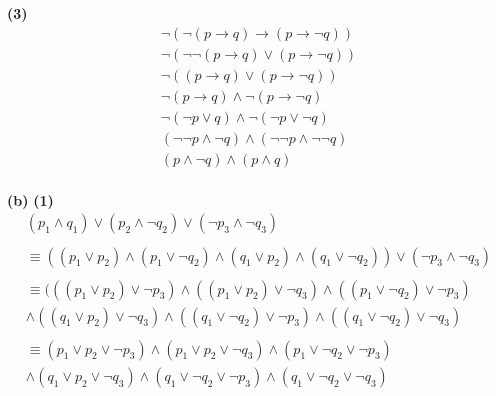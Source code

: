 \documentclass[11pt]{article}
\renewcommand{\part}[1] {\vspace{.10in} {\bf (#1)}}
\begin{document}
\part{3}
\begin{eqnarray*}
\neg (\neg(p \rightarrow q) \rightarrow (p \rightarrow \neg q))\\
\neg (\neg \neg(p \rightarrow q) \vee (p \rightarrow \neg q))\\
\neg ((p \rightarrow q) \vee (p \rightarrow \neg q))\\
\neg (p \rightarrow q) \wedge \neg (p \rightarrow \neg q)\\
\neg (\neg p \vee q) \wedge \neg (\neg p \vee \neg q)\\
(\neg \neg p \wedge \neg q) \wedge (\neg \neg p \wedge \neg \neg q)\\
(p \wedge \neg q) \wedge (p \wedge q)\\
\end{eqnarray*}

\part{b}
\part{1}
\begin{eqnarray*}
(p_1 \wedge q_1) \vee (p_2 \wedge \neg q_2) \vee (\neg p_3 \wedge \neg q_3)\\
\\
\equiv ((p_1 \vee p_2) \wedge (p_1 \vee \neg q_2) \wedge (q_1 \vee p_2) \wedge (q_1 \vee \neg q_2)) \vee (\neg p_3 \wedge \neg q_3)\\
\\
\equiv (((p_1 \vee p_2) \vee \neg p_3) \wedge ((p_1 \vee p_2) \vee \neg q_3) \wedge ((p_1 \vee \neg q_2) \vee \neg p_3)\\
\wedge ((q_1 \vee p_2) \vee \neg q_3) \wedge ((q_1 \vee \neg q_2) \vee \neg p_3) \wedge ((q_1 \vee \neg q_2) \vee \neg q_3)\\
\\
\equiv (p_1 \vee p_2 \vee \neg p_3) \wedge (p_1 \vee p_2 \vee \neg q_3) \wedge (p_1 \vee \neg q_2 \vee \neg p_3)\\
\wedge (q_1 \vee p_2 \vee \neg q_3) \wedge (q_1 \vee \neg q_2 \vee \neg p_3) \wedge (q_1 \vee \neg q_2 \vee \neg q_3)\\
\end{eqnarray*}
\end{document}
